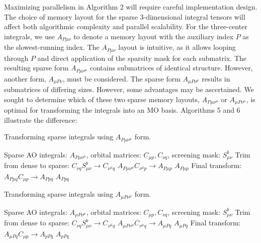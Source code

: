 Maximizing parallelism in Algorithm 2 will require careful implementation design. 
The choice of memory layout for the sparse 3-dimensional integral tensors will affect both algorithmic 
complexity and parallel scalability. For the three-center integrals, we use $A_{P\mu \nu}$ to denote a memory 
layout with the auxiliary index $P$ as the slowest-running index. 
The $A_{P \mu \nu}$ layout is intuitive, as it allows looping through $P$ and direct application of the sparsity mask 
for each submatrix. The resulting sparse form $A_{P \mu \nu^\mu}$ contains submatrices of identical structure.
However, another form, $A_{\mu P \nu}$, must be considered. The sparse form $A_{\mu P \nu^\mu}$
results in submatrices of differing sizes. However, some advantages may be ascertained.
We sought to determine which of these two sparse memory layouts, $A_{P \mu \nu^\mu}$ or 
$A_{\mu P \nu^\mu}$, is optimal for transforming the integrals into an MO basis.
Algorithms 5 and 6 illustrate the difference:

\begin{algorithm}[H]
\caption{Transforming sparse integrals using $A_{P \mu \nu^\mu}$ form.}
\begin{algorithmic}
\REQUIRE Sparse AO integrals: $A_{P \mu \nu^\mu}$, orbital matrices: $C_{\mu p}, C_{\nu q}$, screening mask: $S_{\mu \nu}^b$
        \STATE Trim from dense to sparse: $C_{\nu q}S_{\mu \nu}^b \rightarrow C_{\nu^{\mu} q}$
        \STATE $A_{P \mu \nu^\mu} C_{\nu^{\mu} p} \rightarrow A_{P \mu p}$
    \ENDFOR
\ENDFOR
\RETURN $A_{P \mu p}$
\STATE Final transform: $A_{P \mu q}C_{\mu p} \rightarrow A_{P p q}$
\RETURN $A_{P p q}$
\end{algorithmic}
\end{algorithm}

\begin{algorithm}[H]
\caption{Transforming sparse integrals using $A_{\mu P \nu^\mu}$ form.}
\begin{algorithmic}
\REQUIRE Sparse AO integrals: $A_{\mu P \nu^\mu}$, orbital matrices: $C_{\mu p}, C_{\nu q}$, screening mask: $S_{\mu \nu}^b$
    \STATE Trim from dense to sparse: $C_{\nu q}S_{\mu \nu}^b \rightarrow C_{\nu^{\mu} q}$
    \STATE $A_{\mu P \nu^{\mu}} C_{\nu^{\mu} q} \rightarrow A_{\mu Pq}$
\ENDFOR
\RETURN $A_{\mu P q}$
\STATE Final transform: $A_{\mu P q}C_{\mu p} \rightarrow A_{p P q}$
\RETURN $A_{p P q}$
\end{algorithmic}
\end{algorithm}


